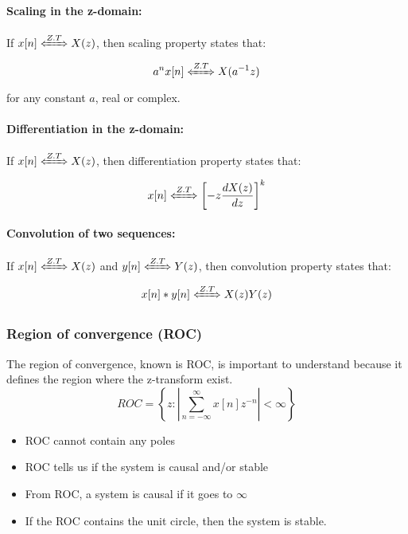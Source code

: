 \documentclass{article}
\begin{document}
\paragraph{Scaling in the z-domain:} 
If $x[n] \xLeftrightarrow{Z.T} X(z)$, then scaling property states that:
\begin{equation}
    a^nx[n] \xLeftrightarrow{Z.T} X(a^{-1}z)
\end{equation}
for any constant $a$, real or complex.

\paragraph{Differentiation in the z-domain:}
If $x[n] \xLeftrightarrow{Z.T} X(z)$, then differentiation property states that:
\begin{equation}
    x[n] \xLeftrightarrow{Z.T} \left [-z\frac{dX(z)}{dz} \right ]^k
\end{equation}

\paragraph{Convolution of two sequences:} 
If $x[n] \xLeftrightarrow{Z.T} X(z)$ and $y[n] \xLeftrightarrow{Z.T} Y(z)$, then convolution property states that:
\begin{equation}
    x[n] \ast y[n] \xLeftrightarrow{Z.T} X(z)Y(z)
\end{equation}

\subsubsection{Region of convergence (ROC)}
The region of convergence, known is ROC, is important to understand because it defines the region where the z-transform exist.
\begin{equation}
    ROC = \left \{z:\left|\sum_{n=-\infty}^{\infty}x[n]z^{-n} \right| < \infty \right \}
\end{equation}
\begin{itemize}
    \item ROC cannot contain any poles
    \item ROC tells us if the system is causal and/or stable
    \item From ROC, a system is causal if it goes to $\infty$
    \item If the ROC contains the unit circle, then the system is stable.
\end{itemize}
\end{document}
